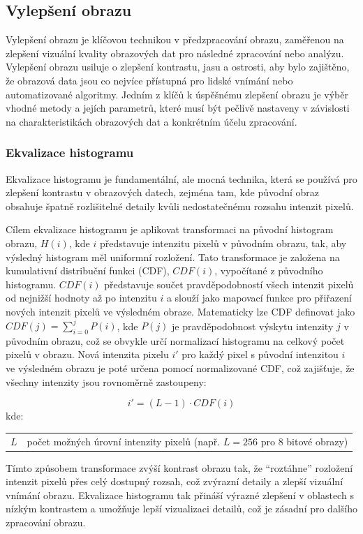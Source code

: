\documentclass[male,czech,api_ing]{thesis}
\makeatletter
\newenvironment{conditions}[1][kde:]
    {#1 \begin{tabular}[t]{>{$}l<{$} @{${}={}$} >{\raggedright\arraybackslash}p{10cm}}}
    {\end{tabular}}
\makeatother
\begin{document}
\subsection{Vylepšení obrazu}
Vylepšení obrazu je klíčovou technikou v předzpracování obrazu, zaměřenou na zlepšení vizuální kvality obrazových dat pro následné zpracování nebo analýzu. Vylepšení obrazu usiluje o zlepšení kontrastu, jasu a ostrosti, aby bylo zajištěno, že obrazová data jsou co nejvíce přístupná pro lidské vnímání nebo automatizované algoritmy. 
Jedním z klíčů k úspěšnému zlepšení obrazu je výběr vhodné metody a jejích parametrů, které musí být pečlivě nastaveny v závislosti na charakteristikách obrazových dat a konkrétním účelu zpracování. 

\subsubsection{Ekvalizace histogramu}
Ekvalizace histogramu je fundamentální, ale mocná technika, která se používá pro zlepšení kontrastu v obrazových datech, zejména tam, kde původní obraz obsahuje špatně rozlišitelné detaily kvůli nedostatečnému rozsahu intenzit pixelů.

Cílem ekvalizace histogramu je aplikovat transformaci na původní histogram obrazu, $H(i)$, kde $i$ představuje intenzitu pixelů v původním obrazu, tak, aby výsledný histogram měl uniformní rozložení. Tato transformace je založena na kumulativní distribuční funkci (CDF), $CDF(i)$, vypočítané z původního histogramu. $CDF(i)$ představuje součet pravděpodobností všech intenzit pixelů od nejnižší hodnoty až po intenzitu $i$ a slouží jako mapovací funkce pro přiřazení nových intenzit pixelů ve výsledném obraze. Matematicky lze CDF definovat jako $CDF(j) = \sum_{i=0}^{j} P(i)$, kde $P(j)$ je pravděpodobnost výskytu intenzity $j$ v původním obrazu, což se obvykle určí normalizací histogramu na celkový počet pixelů v obrazu. Nová intenzita pixelu $i'$ pro každý pixel s původní intenzitou $i$ ve výsledném obrazu je poté určena pomocí normalizované CDF, což zajišťuje, že všechny intenzity jsou rovnoměrně zastoupeny:

\begin{equation}
    i' = (L-1) \cdot CDF(i)
\end{equation}
\begin{conditions}
    L & počet možných úrovní intenzity pixelů (např. $L = 256$ pro 8 bitové obrazy)
\end{conditions}

Tímto způsobem transformace zvýší kontrast obrazu tak, že ``roztáhne'' rozložení intenzit pixelů přes celý dostupný rozsah, což zvýrazní detaily a zlepší vizuální vnímání obrazu. Ekvalizace histogramu tak přináší výrazné zlepšení v oblastech s nízkým kontrastem a umožňuje lepší vizualizaci detailů, což je zásadní pro dalšího zpracování obrazu. \cite{ComputerVisionMetrics} \cite{ComputerVisionForX-RayTesting}
\end{document}
